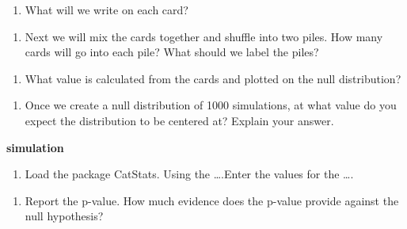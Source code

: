 \documentclass[
]{report}
\providecommand{\tightlist}{%
  \setlength{\itemsep}{0pt}\setlength{\parskip}{0pt}}
\begin{document}
\begin{enumerate}
\def\labelenumi{\arabic{enumi}.}
\setcounter{enumi}{10}
\tightlist
\item
  What will we write on each card?
\end{enumerate}

\vspace{0.5in}

\begin{enumerate}
\def\labelenumi{\arabic{enumi}.}
\setcounter{enumi}{11}
\tightlist
\item
  Next we will mix the cards together and shuffle into two piles. How many cards will go into each pile? What should we label the piles?
\end{enumerate}

\vspace{1in}

\begin{enumerate}
\def\labelenumi{\arabic{enumi}.}
\setcounter{enumi}{12}
\tightlist
\item
  What value is calculated from the cards and plotted on the null distribution?
\end{enumerate}

\vspace{1in}

\begin{enumerate}
\def\labelenumi{\arabic{enumi}.}
\setcounter{enumi}{13}
\tightlist
\item
  Once we create a null distribution of 1000 simulations, at what value do you expect the distribution to be centered at? Explain your answer.
\end{enumerate}

\vspace{1in}

\textbf{simulation}

\begin{enumerate}
\def\labelenumi{\arabic{enumi}.}
\setcounter{enumi}{14}
\tightlist
\item
  Load the package CatStats. Using the \ldots.Enter the values for the \ldots.
\end{enumerate}

\vspace{1in}

\begin{enumerate}
\def\labelenumi{\arabic{enumi}.}
\setcounter{enumi}{15}
\tightlist
\item
  Report the p-value. How much evidence does the p-value provide against the null hypothesis?
\end{enumerate}
\end{document}
